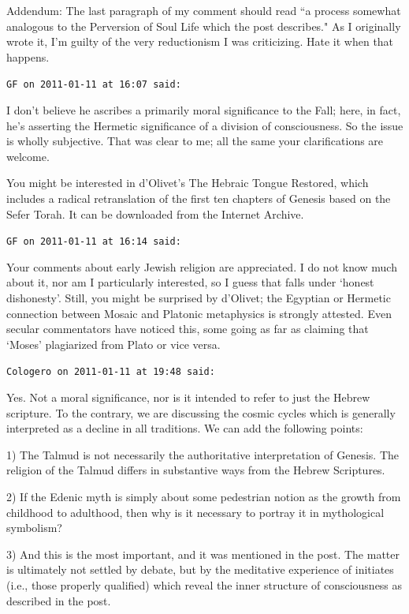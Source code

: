 \begin{footnotesize}
\begin{sffamily}
Addendum: The last paragraph of my comment should read ``a process somewhat analogous to the Perversion of Soul Life which the post describes." As I originally wrote it, I'm guilty of the very reductionism I was criticizing. Hate it when that happens.


\hfill

\texttt{GF on 2011-01-11 at 16:07 said: }

I don't believe he ascribes a primarily moral significance to the Fall; here, in fact, he's asserting the Hermetic significance of a division of consciousness. So the issue is wholly subjective. That was clear to me; all the same your clarifications are welcome. 

You might be interested in d'Olivet's The Hebraic Tongue Restored, which includes a radical retranslation of the first ten chapters of Genesis based on the Sefer Torah. It can be downloaded from the Internet Archive.


\hfill

\texttt{GF on 2011-01-11 at 16:14 said: }

Your comments about early Jewish religion are appreciated. I do not know much about it, nor am I particularly interested, so I guess that falls under `honest dishonesty'. Still, you might be surprised by d'Olivet; the Egyptian or Hermetic connection between Mosaic and Platonic metaphysics is strongly attested. Even secular commentators have noticed this, some going as far as claiming that `Moses' plagiarized from Plato or vice versa.


\hfill

\texttt{Cologero on 2011-01-11 at 19:48 said: }

Yes. Not a moral significance, nor is it intended to refer to just the Hebrew scripture. To the contrary, we are discussing the cosmic cycles which is generally interpreted as a decline in all traditions. We can add the following points:

1) The Talmud is not necessarily the authoritative interpretation of Genesis. The religion of the Talmud differs in substantive ways from the Hebrew Scriptures.

2) If the Edenic myth is simply about some pedestrian notion as the growth from childhood to adulthood, then why is it necessary to portray it in mythological symbolism?

3) And this is the most important, and it was mentioned in the post. The matter is ultimately not settled by debate, but by the meditative experience of initiates (i.e., those properly qualified) which reveal the inner structure of consciousness as described in the post.



\end{sffamily}
\end{footnotesize}
